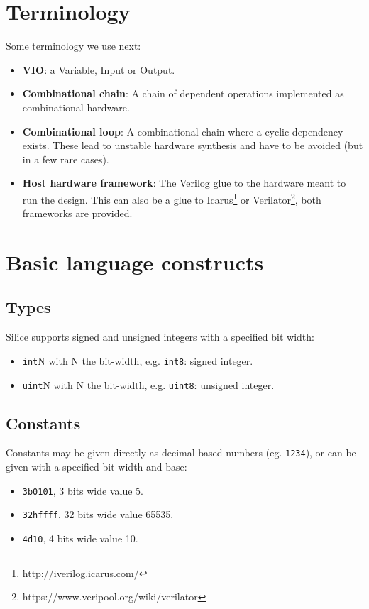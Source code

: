 \documentclass[a4]{article}
\newcommand\verilog{Verilog}
\newcommand\silice{Silice}
\begin{document}
\section{Terminology}
Some terminology we use next:
\begin{itemize}
\item \textbf{VIO}: a Variable, Input or Output.
\item \textbf{Combinational chain}: A chain of dependent operations implemented
as combinational hardware.
\item \textbf{Combinational loop}: A combinational chain where a cyclic dependency exists. These lead to unstable hardware synthesis and have to be avoided (but in a few rare cases).
\item \textbf{Host hardware framework}: The \verilog{} glue to the hardware meant to run the design. This can also be a glue to Icarus\footnote{http://iverilog.icarus.com/} or Verilator\footnote{https://www.veripool.org/wiki/verilator}, both frameworks are provided.
\end{itemize}


\section{Basic language constructs}

\subsection{Types}
\label{sec:types}

\silice{} supports signed and unsigned integers with a specified bit width:

\begin{itemize}
	\item \texttt{int}N with N the bit-width, e.g. \texttt{int8}: signed integer.
	\item \texttt{uint}N with N the bit-width, e.g. \texttt{uint8}: unsigned integer.
\end{itemize}


\subsection{Constants}
\label{sec:csts}

Constants may be given directly as decimal based numbers (eg. \texttt{1234}), or
can be given with a specified bit width and base:
\begin{itemize}
	\item \texttt{3b0101}, 3 bits wide value 5.
	\item \texttt{32hffff}, 32 bits wide value 65535.
	\item \texttt{4d10}, 4 bits wide value 10.
\end{itemize}
\end{document}
